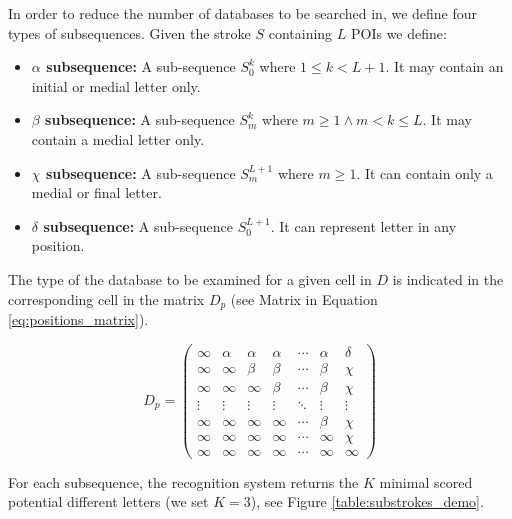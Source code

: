 \documentclass[journal,compsoc]{IEEEtran}
\begin{document}
In order to reduce the number of databases to be searched in, we define four types of subsequences. Given the stroke $S$ containing $L$ POIs we define: 
\begin{itemize}
	\item \textbf{$\alpha$ subsequence:}  A sub-sequence $S_0^k$ where $ 1\leq k < L+1$. It may contain an initial or medial letter only.
	\item \textbf{$\beta$ subsequence:}  A sub-sequence $S_m^k$ where $m \geq 1 \wedge m< k \leq L$. It may contain a medial letter only.
	\item \textbf{$\chi$ subsequence:}  A sub-sequence $S_m^{L+1}$ where $m \geq 1$. It can contain only a medial or final letter.
	\item \textbf{$\delta$ subsequence:} A sub-sequence $S_0^{L+1}$. It can represent letter in any position.
\end{itemize}

The type of the database to be examined for a given cell in $D$ is indicated in the corresponding cell in the matrix $D_p$ (see Matrix in Equation \ref{eq:positions_matrix}). 

\begin{equation}
D_{p}=
\left( 
\begin{array}{ccccccc}
\infty 	& \alpha & \alpha & \alpha  & \cdots & \alpha & \delta \\
\infty  & \infty  & \beta   & \beta   & \cdots  & \beta  & \chi    \\
\infty  & \infty  & \infty   & \beta   & \cdots  & \beta  & \chi    \\
\vdots & \vdots & \vdots  & \vdots & \ddots  & \vdots & \vdots \\
\infty  & \infty  & \infty   & \infty   & \cdots  & \beta  & \chi    \\
\infty  & \infty  & \infty   & \infty   & \cdots  & \infty  & \chi    \\
\infty  & \infty  & \infty   & \infty   & \cdots  & \infty  & \infty \end{array} \right)
\label{eq:positions_matrix}
\end{equation}

For each subsequence, the recognition system returns the $K$ minimal scored potential different letters (we set $K=3$), see Figure \ref{table:substrokes_demo}.\\
\end{document}
